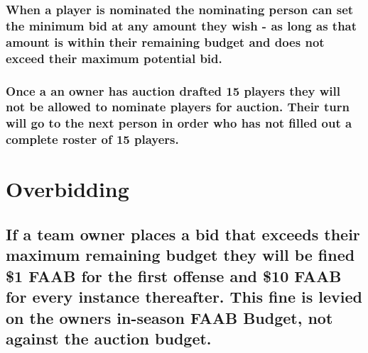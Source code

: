 \documentclass[
]{book}
\begin{document}
\hypertarget{when-a-player-is-nominated-the-nominating-person-can-set-the-minimum-bid-at-any-amount-they-wish---as-long-as-that-amount-is-within-their-remaining-budget-and-does-not-exceed-their-maximum-potential-bid.}{%
\subsubsection{When a player is nominated the nominating person can set the minimum bid at any amount they wish - as long as that amount is within their remaining budget and does not exceed their maximum potential bid.}\label{when-a-player-is-nominated-the-nominating-person-can-set-the-minimum-bid-at-any-amount-they-wish---as-long-as-that-amount-is-within-their-remaining-budget-and-does-not-exceed-their-maximum-potential-bid.}}

\hypertarget{once-a-an-owner-has-auction-drafted-15-players-they-will-not-be-allowed-to-nominate-players-for-auction.-their-turn-will-go-to-the-next-person-in-order-who-has-not-filled-out-a-complete-roster-of-15-players.}{%
\subsubsection{Once a an owner has auction drafted 15 players they will not be allowed to nominate players for auction. Their turn will go to the next person in order who has not filled out a complete roster of 15 players.}\label{once-a-an-owner-has-auction-drafted-15-players-they-will-not-be-allowed-to-nominate-players-for-auction.-their-turn-will-go-to-the-next-person-in-order-who-has-not-filled-out-a-complete-roster-of-15-players.}}

\hypertarget{overbidding}{%
\section{Overbidding}\label{overbidding}}

\hypertarget{if-a-team-owner-places-a-bid-that-exceeds-their-maximum-remaining-budget-they-will-be-fined-1-faab-for-the-first-offense-and-10-faab-for-every-instance-thereafter.-this-fine-is-levied-on-the-owners-in-season-faab-budget-not-against-the-auction-budget.}{%
\subsection{If a team owner places a bid that exceeds their maximum remaining budget they will be fined \$1 FAAB for the first offense and \$10 FAAB for every instance thereafter. This fine is levied on the owners in-season FAAB Budget, not against the auction budget.}\label{if-a-team-owner-places-a-bid-that-exceeds-their-maximum-remaining-budget-they-will-be-fined-1-faab-for-the-first-offense-and-10-faab-for-every-instance-thereafter.-this-fine-is-levied-on-the-owners-in-season-faab-budget-not-against-the-auction-budget.}}
\end{document}

